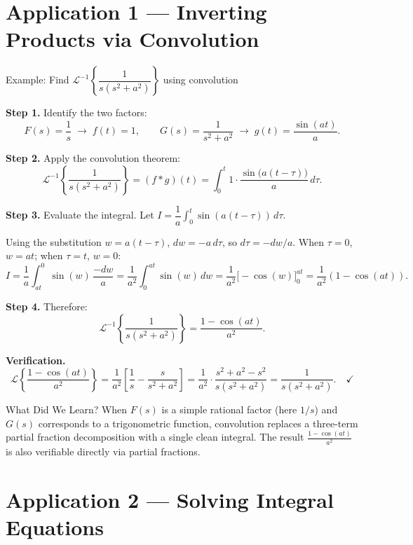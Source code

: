 \documentclass[12pt,a4paper]{article}
\begin{document}
\section{Application 1 --- Inverting Products via Convolution}

\begin{infobox}{Example: Find $\mathcal{L}^{-1}\!\left\{\dfrac{1}{s(s^2+a^2)}\right\}$ using convolution}

\textbf{Step 1.} Identify the two factors:
\[
  F(s) = \frac{1}{s} \;\longrightarrow\; f(t) = 1,
  \qquad
  G(s) = \frac{1}{s^2+a^2} \;\longrightarrow\; g(t) = \frac{\sin(at)}{a}.
\]

\textbf{Step 2.} Apply the convolution theorem:
\[
  \mathcal{L}^{-1}\!\left\{\frac{1}{s(s^2+a^2)}\right\}
    = (f * g)(t)
    = \int_0^t 1 \cdot \frac{\sin\bigl(a(t-\tau)\bigr)}{a}\,d\tau.
\]

\textbf{Step 3.} Evaluate the integral. Let $I = \dfrac{1}{a}\int_0^t \sin(a(t-\tau))\,d\tau$.

Using the substitution $w = a(t-\tau)$, $dw = -a\,d\tau$, so
$d\tau = -dw/a$. When $\tau=0$, $w=at$; when $\tau=t$, $w=0$:
\[
  I = \frac{1}{a}\int_{at}^{0}\sin(w)\,\frac{-dw}{a}
    = \frac{1}{a^2}\int_0^{at}\sin(w)\,dw
    = \frac{1}{a^2}\bigl[-\cos(w)\bigr]_0^{at}
    = \frac{1}{a^2}(1 - \cos(at)).
\]

\textbf{Step 4.} Therefore:
\[
  \mathcal{L}^{-1}\!\left\{\frac{1}{s(s^2+a^2)}\right\}
    = \frac{1-\cos(at)}{a^2}.
\]

\textbf{Verification.}
\[
  \mathcal{L}\!\left\{\frac{1-\cos(at)}{a^2}\right\}
    = \frac{1}{a^2}\left[\frac{1}{s} - \frac{s}{s^2+a^2}\right]
    = \frac{1}{a^2}\cdot\frac{s^2+a^2-s^2}{s(s^2+a^2)}
    = \frac{1}{s(s^2+a^2)}. \quad\checkmark
\]
\end{infobox}

\begin{learnbox}{What Did We Learn?}
When $F(s)$ is a simple rational factor (here $1/s$) and $G(s)$ corresponds to
a trigonometric function, convolution replaces a three-term partial fraction
decomposition with a single clean integral. The result $\frac{1-\cos(at)}{a^2}$
is also verifiable directly via partial fractions.
\end{learnbox}

\section{Application 2 --- Solving Integral Equations}
\end{document}
